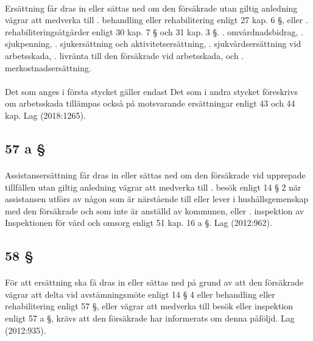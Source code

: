 \documentclass[a4paper,notitlepage,openany,10pt]{book}
\begin{document}
\paragraph*{}
Ersättning får dras in eller sättas ned om den försäkrade utan giltig anledning vägrar att medverka till
. behandling eller rehabilitering enligt 27 kap. 6 §, eller
. rehabiliteringsåtgärder enligt 30 kap. 7 § och 31 kap. 3 §.
. omvårdnadsbidrag,
. sjukpenning,
. sjukersättning och aktivitetsersättning,
. sjukvårdsersättning vid arbetsskada,
. livränta till den försäkrade vid arbetsskada, och
. merkostnadsersättning.
\paragraph*{}
Det som anges i första stycket gäller endast
Det som i andra stycket föreskrivs om arbetsskada tillämpas också på motsvarande ersättningar enligt 43 och 44 kap.
Lag (2018:1265).
\subsection*{57 a §}
\paragraph*{}
Assistansersättning får dras in eller sättas ned om den försäkrade vid upprepade tillfällen utan giltig anledning vägrar att medverka till
. besök enligt 14 § 2 när assistansen utförs av någon som är närstående till eller lever i hushållsgemenskap med den försäkrade och som inte är anställd av kommunen, eller
. inspektion av Inspektionen för vård och omsorg enligt 51 kap. 16 a §.
Lag (2012:962).
\subsection*{58 §}
\paragraph*{}
För att ersättning ska få dras in eller sättas ned på grund av att den försäkrade vägrar att delta vid avstämningsmöte enligt 14 § 4 eller behandling eller rehabilitering enligt 57 §, eller vägrar att medverka till besök eller inspektion enligt 57 a §, krävs att den försäkrade har informerats om denna påföljd.
Lag (2012:935).
\end{document}
